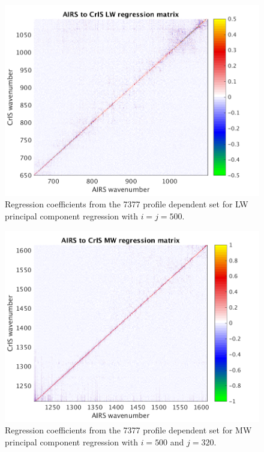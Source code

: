 \documentclass[10pt,twocolumn]{article}
\begin{document}
\begin{figure} %
  \centering
  \includegraphics[width=\linewidth]{figures/LW_pc_regr_mat.png}
  \caption{Regression coefficients from the 7377 profile dependent
    set for LW principal component regression with $i = j = 500$.}
  \label{dreg7}
\end{figure}

\begin{figure} %
  \centering
  \includegraphics[width=\linewidth]{figures/MW_pc_regr_mat.png}
  \caption{Regression coefficients from the 7377 profile dependent
    set for MW principal component regression with $i = 500$ and $j
    = 320$.}
  \label{dreg8}
\end{figure}
\end{document}
